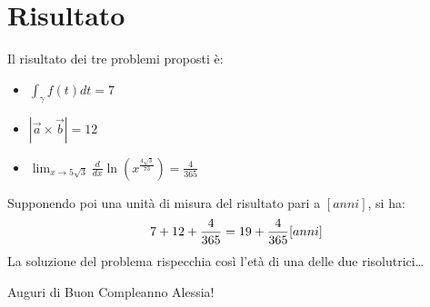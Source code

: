 
\section{Risultato}
Il risultato dei tre problemi proposti è:
\begin{itemize}
    \item $\int_{\gamma} f(t) dt = 7$
    \item $|\vec{a} \times \vec{b}| = 12$
    \item $\lim_{x \rightarrow 5\sqrt{3}} \frac{d}{dx} \ln(x^{\frac{4\sqrt{3}}{73}}) = \frac{4}{365}$
\end{itemize}
Supponendo poi una unità di misura del risultato pari a $[anni]$, si ha:
\begin{equation}
    7 + 12 + \frac{4}{365} = 19 + \frac{4}{365} \space [anni]
\end{equation}
La soluzione del problema rispecchia così l'età di una delle due risolutrici\dots

\begin{center}
    \huge Auguri di Buon Compleanno Alessia!
\end{center}